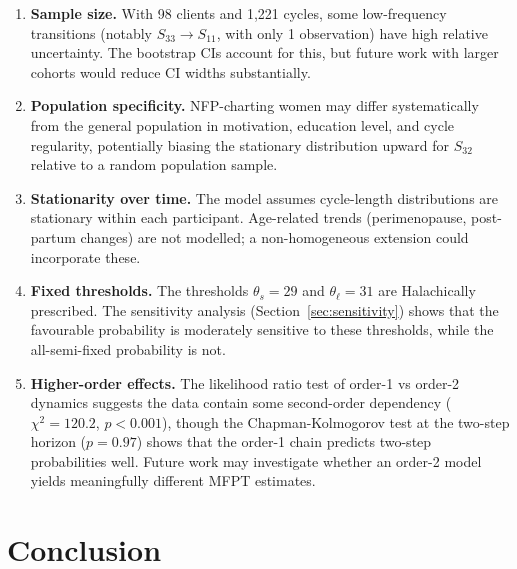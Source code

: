 \documentclass[12pt,a4paper]{article}
\begin{document}
\begin{enumerate}
  \item \textbf{Sample size.}  With 98 clients and 1{,}221 cycles, some
        low-frequency transitions (notably $S_{33}\to S_{11}$, with only 1
        observation) have high relative uncertainty.  The bootstrap CIs account
        for this, but future work with larger cohorts would reduce CI widths
        substantially.

  \item \textbf{Population specificity.}  NFP-charting women may differ
        systematically from the general population in motivation, education level,
        and cycle regularity, potentially biasing the stationary distribution
        upward for $S_{32}$ relative to a random population sample.

  \item \textbf{Stationarity over time.}  The model assumes cycle-length
        distributions are stationary within each participant.  Age-related trends
        (perimenopause, post-partum changes) are not modelled; a non-homogeneous
        extension could incorporate these.

  \item \textbf{Fixed thresholds.}  The thresholds $\theta_s = 29$ and
        $\theta_\ell = 31$ are Halachically prescribed.  The sensitivity
        analysis (Section~\ref{sec:sensitivity}) shows that the favourable
        probability is moderately sensitive to these thresholds, while the
        all-semi-fixed probability is not.

  \item \textbf{Higher-order effects.}  The likelihood ratio test of order-1 vs
        order-2 dynamics suggests the data contain some second-order dependency
        ($\chi^2 = 120.2$, $p < 0.001$), though the Chapman-Kolmogorov test at
        the two-step horizon ($p = 0.97$) shows that the order-1 chain predicts
        two-step probabilities well.  Future work may investigate whether an
        order-2 model yields meaningfully different MFPT estimates.
\end{enumerate}

\section{Conclusion}
\label{sec:conclusion}
\end{document}
